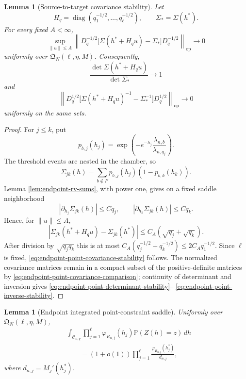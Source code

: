 \documentclass[11pt]{article}
\newtheorem{lemma}[theorem]{Lemma}
\theoremstyle{remark}
\newcommand{\Pp}{\mathbb P}
\newcommand{\diag}{\operatorname{diag}}
\newcommand{\dd}{\,d}
\begin{document}
\begin{lemma}[Source-to-target covariance stability]
\label{lem:endpoint-point-covariance-stability}
Let
\[
        H_q=\diag(q_1^{-1/2},\ldots,q_\ell^{-1/2}),
        \qquad \Sigma_*=\Sigma(h^*).
\]
For every fixed $A<\infty$,
\[
\sup_{\|u\|\le A}
\left\|
D_q^{-1/2}
\bigl[\Sigma(h^*+H_qu)-\Sigma_*\bigr]
D_q^{-1/2}
\right\|_{\mathrm{op}}\longrightarrow0
\tag{10.27}\label{eq:endpoint-point-covariance-stability}
\]
uniformly over $\mathfrak Q_N(\ell,\eta,M)$.  Consequently,
\[
        \frac{\det\Sigma(h^*+H_qu)}{\det\Sigma_*}\longrightarrow1
\tag{10.28}\label{eq:endpoint-point-determinant-stability}
\]
and
\[
\left\|
D_q^{1/2}
\bigl[\Sigma(h^*+H_qu)^{-1}-\Sigma_*^{-1}\bigr]
D_q^{1/2}
\right\|_{\mathrm{op}}\longrightarrow0
\tag{10.29}\label{eq:endpoint-point-inverse-stability}
\]
uniformly on the same sets.
\end{lemma}

\begin{proof}
For $j\le k$, put
\[
        p_{b,j}(h_j)=
        \exp\left(-e^{-h_j}
        \frac{\lambda_{n,b}}{\lambda_{n,q_j}}\right).
\]
The threshold events are nested in the chamber, so
\[
        \Sigma_{jk}(h)
        =\sum_{b\notin P}p_{b,j}(h_j)(1-p_{b,k}(h_k)).
\tag{10.30}\label{eq:endpoint-point-covariance-entry}
\]
Lemma \ref{lem:endpoint-rv-sums}, with power one, gives on a fixed saddle
neighborhood
\[
        |\partial_{h_j}\Sigma_{jk}(h)|\le Cq_j,
        \qquad
        |\partial_{h_k}\Sigma_{jk}(h)|\le Cq_k.
\]
Hence, for $\|u\|\le A$,
\[
        |\Sigma_{jk}(h^*+H_qu)-\Sigma_{jk}(h^*)|
        \le C_A(\sqrt{q_j}+\sqrt{q_k}).
\]
After division by $\sqrt{q_jq_k}$ this is at most
$C_A(q_j^{-1/2}+q_k^{-1/2})\le2C_Aq_1^{-1/2}$.  Since $\ell$ is fixed,
\eqref{eq:endpoint-point-covariance-stability} follows.  The normalized
covariance matrices remain in a compact subset of the positive-definite
matrices by \eqref{eq:endpoint-point-covariance-comparison}; continuity of
determinant and inversion gives
\eqref{eq:endpoint-point-determinant-stability}--
\eqref{eq:endpoint-point-inverse-stability}.
\end{proof}

\begin{lemma}[Endpoint integrated point-constraint saddle]
\label{lem:endpoint-general-integrated-saddle}
Uniformly over $\mathfrak Q_N(\ell,\eta,M)$,
\[
\begin{aligned}
&\int_{\mathscr C_{n,q}}
\prod_{j=1}^\ell\varphi_{R_{n,j}}(h_j)
\Pp(Z(h)=z)\dd h\\
&\qquad=(1+o(1))
\prod_{j=1}^\ell
\frac{\varphi_{R_{n,j}}(h_j^*)}{d_{n,j}},
\end{aligned}
\tag{10.31}\label{eq:endpoint-point-integrated-saddle}
\]
where $d_{n,j}=M_j'(h_j^*)$.
\end{lemma}
\end{document}
